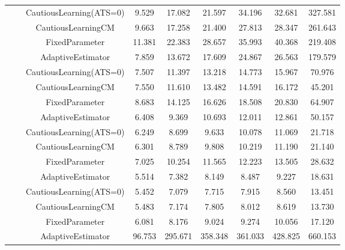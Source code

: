 \begin{table}[!h]
\begin{tabular}[t]{ccccccccc}
 &  & CautiousLearning(ATS=0) & 9.529 & 17.082 & 21.597 & 34.196 & 32.681 & 327.581\\

 &  & CautiousLearningCM & 9.663 & 17.258 & 21.400 & 27.813 & 28.347 & 261.643\\

 & \multirow[t]{-4}{*}{\centering\arraybackslash 0.75} & FixedParameter & 11.381 & 22.383 & 28.657 & 35.993 & 40.368 & 219.408\\
\cmidrule{2-9}
 &  & AdaptiveEstimator & 7.859 & 13.672 & 17.609 & 24.867 & 26.563 & 179.579\\

 &  & CautiousLearning(ATS=0) & 7.507 & 11.397 & 13.218 & 14.773 & 15.967 & 70.976\\

 &  & CautiousLearningCM & 7.550 & 11.610 & 13.482 & 14.591 & 16.172 & 45.201\\

 & \multirow[t]{-4}{*}{\centering\arraybackslash 1.00} & FixedParameter & 8.683 & 14.125 & 16.626 & 18.508 & 20.830 & 64.907\\
\cmidrule{2-9}
 &  & AdaptiveEstimator & 6.408 & 9.369 & 10.693 & 12.011 & 12.861 & 50.157\\

 &  & CautiousLearning(ATS=0) & 6.249 & 8.699 & 9.633 & 10.078 & 11.069 & 21.718\\

 &  & CautiousLearningCM & 6.301 & 8.789 & 9.808 & 10.219 & 11.190 & 21.140\\

 & \multirow[t]{-4}{*}{\centering\arraybackslash 1.25} & FixedParameter & 7.025 & 10.254 & 11.565 & 12.223 & 13.505 & 28.632\\
\cmidrule{2-9}
 &  & AdaptiveEstimator & 5.514 & 7.382 & 8.149 & 8.487 & 9.227 & 18.631\\

 &  & CautiousLearning(ATS=0) & 5.452 & 7.079 & 7.715 & 7.915 & 8.560 & 13.451\\

 &  & CautiousLearningCM & 5.483 & 7.174 & 7.805 & 8.012 & 8.619 & 13.730\\

\multirow[t]{-28}{*}{\centering\arraybackslash 1} & \multirow[t]{-4}{*}{\centering\arraybackslash 1.50} & FixedParameter & 6.081 & 8.176 & 9.024 & 9.274 & 10.056 & 17.120\\
\cmidrule{1-9}
 &  & AdaptiveEstimator & 96.753 & 295.671 & 358.348 & 361.033 & 428.825 & 660.153\\


\end{tabular}
\end{table}

